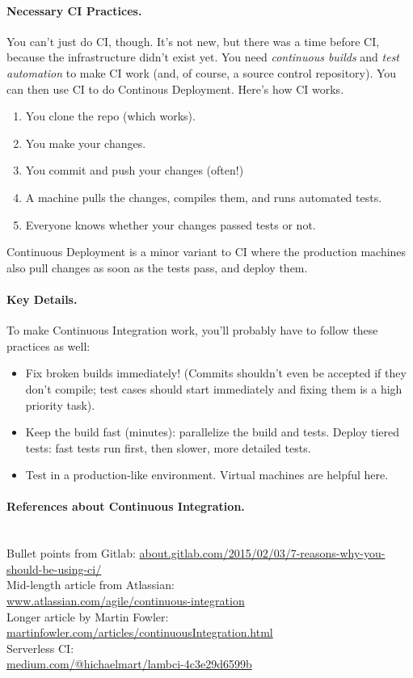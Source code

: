 \documentclass[11pt]{article}
\begin{document}
\paragraph{Necessary CI Practices.} You can't just do CI, though. It's not new, but there
was a time before CI, because the infrastructure didn't exist yet. You need \emph{continuous builds} and \emph{test automation} to make CI work (and, of course, a source control repository).
You can then use CI to do Continous Deployment. Here's how CI works.

    \begin{enumerate}[noitemsep]
    \item You clone the repo (which works).
    \item You make your changes.
    \item You commit and push your changes (often!)
    \item A machine pulls the changes, compiles them, and runs automated tests.
      \item Everyone knows whether your changes passed tests or not.
    \end{enumerate}

Continuous Deployment is a minor variant to CI where the production machines also pull changes
as soon as the tests pass, and deploy them.

\paragraph{Key Details.} To make Continuous Integration work, you'll probably have to follow these practices as well:

    \begin{itemize}[noitemsep]
    \item Fix broken builds immediately! (Commits shouldn't even be accepted if they don't compile; test cases should start immediately and fixing them is a high priority task).
    \item Keep the build fast (minutes): parallelize the build and tests. Deploy tiered tests: fast tests run first, then slower, more detailed tests.
    \item Test in a production-like environment. Virtual machines are helpful here.
    \end{itemize}


\paragraph{References about Continuous Integration.}~\\
    Bullet points from Gitlab: 
    \url{about.gitlab.com/2015/02/03/7-reasons-why-you-should-be-using-ci/}\\[1em]
    Mid-length article from Atlassian: \\
\url{www.atlassian.com/agile/continuous-integration}\\[1em]
    Longer article by Martin Fowler: \\
    \url{martinfowler.com/articles/continuousIntegration.html}\\[2em]
    Serverless CI: \\
    \url{medium.com/@hichaelmart/lambci-4c3e29d6599b}
\end{document}
